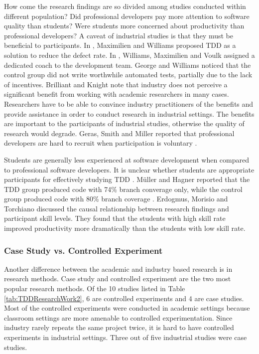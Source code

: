 \documentclass[smallextended]{svjour3}     %
\begin{document}
How come the research findings are so divided among studies 
conducted within different population? Did professional 
developers pay more attention to software quality than 
students? Were students more concerned about productivity
than professional developers?  A caveat of industrial studies 
is that they must be beneficial to participants. 
In \cite{Maximilien:03}, Maximilien and Williams proposed TDD as 
a solution to reduce the defect rate. In \cite{Williams:03}, Williams,
Maximilien and Voulk assigned a dedicated coach to the development 
team. George and Williams \cite{George:03} noticed that the control 
group did not write worthwhile automated tests, partially due to the 
lack of incentives. Brilliant and Knight \cite{Brilliant:99} note 
that industry does not perceive a significant benefit from working 
with academic researchers in many cases. Researchers have to be able
to convince industry practitioners of the benefits and provide 
assistance in order to conduct research in industrial settings. 
The benefits are important to the participants of industrial studies, 
otherwise the quality of research would degrade. Geras, Smith and 
Miller reported that professional developers are hard to recruit 
when participation is voluntary \cite{Geras:04}. 

Students are generally less experienced at software development 
when compared to professional software developers. It is unclear 
whether students are appropriate participants for effectively
studying TDD \cite{Erdogmus:05}. M\"{u}ller and Hagner reported 
that the TDD group produced code with 74\% branch converage only, while the control 
group produced code with 80\% branch coverage \cite{Muller:02}. 
Erdogmus, Morisio and Torchiano \cite{Erdogmus:05} discussed 
the causal relationship between research findings and participant 
skill levels. They found that the students with high skill rate 
improved productivity more dramatically than the students with 
low skill rate. 

\subsubsection{Case Study vs. Controlled Experiment}
Another difference between the academic and industry based research
is in research methods. Case study and 
controlled experiment are the two most popular research methods. 
Of the 10 studies listed in Table \ref{tab:TDDResearchWork2}, 6 
are controlled experiments and 4 are case studies. Most of the
controlled experiments were conducted in academic settings because
classroom settings are more amenable to controlled experimentation. 
Since industry rarely repeats the same project twice, it is hard to have 
controlled experiments in industrial settings. Three out 
of five industrial studies were case studies. 
\end{document}
